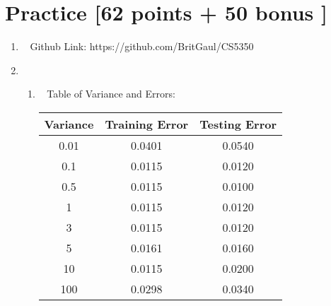 \documentclass[12pt, fullpage,letterpaper]{article}
\begin{document}
\section{Practice [62 points + 50 bonus ]}
\begin{enumerate}
	\item~ 
	\newline Github Link: https://github.com/BritGaul/CS5350

	\item~
	\begin{enumerate}
		\item~
		\newline Table of Variance and Errors:
		\begin{table}[h]
		\centering
		\begin{tabular}{c|c|c}
		Variance & Training Error & Testing Error\\ 
		\hline\hline
		0.01 & 0.0401 & 0.0540 \\ \hline
		0.1 & 0.0115 & 0.0120 \\ \hline
		0.5 & 0.0115 & 0.0100 \\ \hline
		1 & 0.0115 & 0.0120 \\ \hline
		3 & 0.0115 & 0.0120 \\ \hline
		5 & 0.0161 & 0.0160 \\ \hline
		10 & 0.0115 & 0.0200 \\ \hline
		100 & 0.0298 & 0.0340 \\ \hline
		\end{tabular}
		\end{table}
		\newline 
		\newline
		\newline 
		\newline 
		\newline
		\newline 
		\newline 
		\newline
		\newline
		\newline


\end{enumerate}
\end{enumerate}
\end{document}

